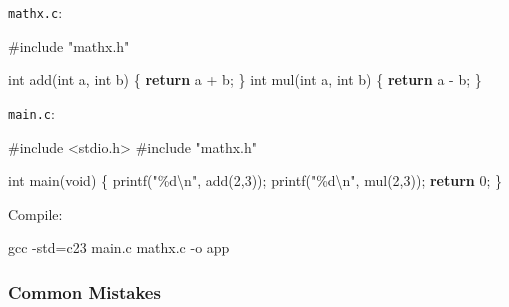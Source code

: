 \documentclass[
  letterpaper,
  DIV=11,
  numbers=noendperiod]{scrreprt}
\newenvironment{Shaded}{\begin{snugshade}}{\end{snugshade}}
\newcommand{\AttributeTok}[1]{\textcolor[rgb]{0.40,0.45,0.13}{#1}}
\newcommand{\ControlFlowTok}[1]{\textcolor[rgb]{0.00,0.23,0.31}{\textbf{#1}}}
\newcommand{\DataTypeTok}[1]{\textcolor[rgb]{0.68,0.00,0.00}{#1}}
\newcommand{\DecValTok}[1]{\textcolor[rgb]{0.68,0.00,0.00}{#1}}
\newcommand{\FunctionTok}[1]{\textcolor[rgb]{0.28,0.35,0.67}{#1}}
\newcommand{\ImportTok}[1]{\textcolor[rgb]{0.00,0.46,0.62}{#1}}
\newcommand{\NormalTok}[1]{\textcolor[rgb]{0.00,0.23,0.31}{#1}}
\newcommand{\OperatorTok}[1]{\textcolor[rgb]{0.37,0.37,0.37}{#1}}
\newcommand{\PreprocessorTok}[1]{\textcolor[rgb]{0.68,0.00,0.00}{#1}}
\newcommand{\SpecialCharTok}[1]{\textcolor[rgb]{0.37,0.37,0.37}{#1}}
\newcommand{\StringTok}[1]{\textcolor[rgb]{0.13,0.47,0.30}{#1}}
\begin{document}
\texttt{mathx.c}:

\begin{Shaded}
\begin{Highlighting}[]
\PreprocessorTok{\#include }\ImportTok{"mathx.h"}

\DataTypeTok{int}\NormalTok{ add}\OperatorTok{(}\DataTypeTok{int}\NormalTok{ a}\OperatorTok{,} \DataTypeTok{int}\NormalTok{ b}\OperatorTok{)} \OperatorTok{\{} \ControlFlowTok{return}\NormalTok{ a }\OperatorTok{+}\NormalTok{ b}\OperatorTok{;} \OperatorTok{\}}
\DataTypeTok{int}\NormalTok{ mul}\OperatorTok{(}\DataTypeTok{int}\NormalTok{ a}\OperatorTok{,} \DataTypeTok{int}\NormalTok{ b}\OperatorTok{)} \OperatorTok{\{} \ControlFlowTok{return}\NormalTok{ a }\OperatorTok{{-}}\NormalTok{ b}\OperatorTok{;} \OperatorTok{\}}
\end{Highlighting}
\end{Shaded}

\texttt{main.c}:

\begin{Shaded}
\begin{Highlighting}[]
\PreprocessorTok{\#include }\ImportTok{\textless{}stdio.h\textgreater{}}
\PreprocessorTok{\#include }\ImportTok{"mathx.h"}

\DataTypeTok{int}\NormalTok{ main}\OperatorTok{(}\DataTypeTok{void}\OperatorTok{)} \OperatorTok{\{}
\NormalTok{    printf}\OperatorTok{(}\StringTok{"}\SpecialCharTok{\%d\textbackslash{}n}\StringTok{"}\OperatorTok{,}\NormalTok{ add}\OperatorTok{(}\DecValTok{2}\OperatorTok{,}\DecValTok{3}\OperatorTok{));}
\NormalTok{    printf}\OperatorTok{(}\StringTok{"}\SpecialCharTok{\%d\textbackslash{}n}\StringTok{"}\OperatorTok{,}\NormalTok{ mul}\OperatorTok{(}\DecValTok{2}\OperatorTok{,}\DecValTok{3}\OperatorTok{));}
    \ControlFlowTok{return} \DecValTok{0}\OperatorTok{;}
\OperatorTok{\}}
\end{Highlighting}
\end{Shaded}

Compile:

\begin{Shaded}
\begin{Highlighting}[]
\FunctionTok{gcc} \AttributeTok{{-}std}\OperatorTok{=}\NormalTok{c23 main.c mathx.c }\AttributeTok{{-}o}\NormalTok{ app}
\end{Highlighting}
\end{Shaded}

\subsubsection{Common Mistakes}\label{common-mistakes-2}
\end{document}
